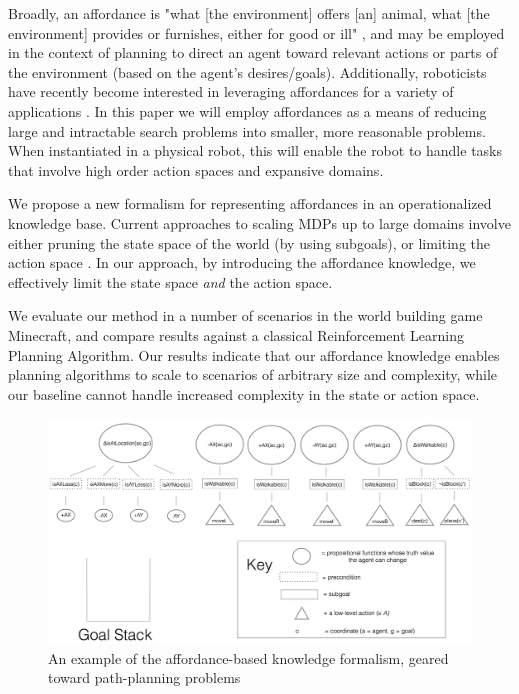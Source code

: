 \documentclass[a4paper]{article}
\begin{document}
Broadly, an affordance is "what [the environment] offers [an] animal, what [the environment] provides or furnishes, either for good or ill" \cite{Gibson}, and may be employed in the context of planning to direct an agent toward relevant actions or parts of the environment (based on the agent's desires/goals). Additionally, roboticists have recently become interested in leveraging affordances for a variety of applications \cite{Koppula2013a} \cite{Koppula2013b}. In this paper we will employ affordances as a means of reducing large and intractable search problems into smaller, more reasonable problems. When instantiated in a physical robot, this will enable the robot to handle tasks that involve high order action spaces and expansive domains.

We propose a new formalism for representing affordances in an operationalized knowledge base. Current approaches to scaling MDPs up to large domains involve either pruning the state space of the world (by using subgoals), or limiting the action space \cite{Branavan2012}. In our approach, by introducing the affordance knowledge, we effectively limit the state space {\it and} the action space.

We evaluate our method in a number of scenarios in the world building game Minecraft, and compare results against a classical Reinforcement Learning Planning Algorithm. Our results indicate that our affordance knowledge enables planning algorithms to scale to scenarios of arbitrary size and complexity, while our baseline cannot handle increased complexity in the state or action space. 

\begin{figure}[t!]
\centering
\includegraphics[scale=0.34]{images/formalism.png}
\caption{An example of the affordance-based knowledge formalism, geared toward path-planning problems}
\label{fig:affordance_tree}
\end{figure}
\end{document}
